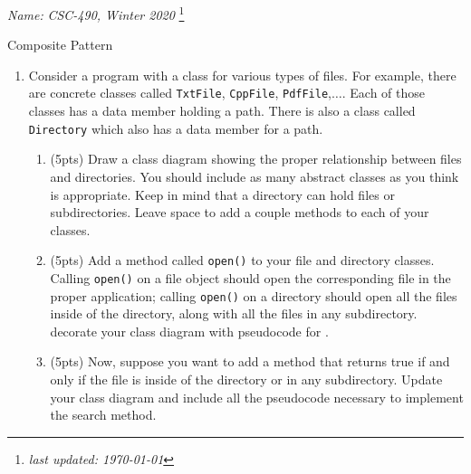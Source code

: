 \documentclass[11pt]{article}
\newlength{\up}\setlength{\up}{-\baselineskip}
\newcommand\blfootnote[1]{%
  \begingroup
  \renewcommand\thefootnote{}\footnote{#1}%
  \addtocounter{footnote}{-1}%
  \endgroup
}
\begin{document}
\noindent\emph{Name:}
\hfill
\emph{CSC-490, Winter 2020}
\blfootnote{\emph{last updated: \today}}

\vspace{-0.4in}

\begin{center}
  {\huge Composite Pattern}
\end{center}

\medskip




\begin{enumerate}

  \item Consider a program with a class for various types of files. For example, there are concrete classes called \texttt{TxtFile}, \texttt{CppFile}, \texttt{PdfFile},$\ldots$. Each of those classes has a data member holding a path. There is also a class called \texttt{Directory} which also has a data member for a path.  

  \begin{enumerate}
    \item (5pts) Draw a class diagram showing the proper relationship between files and directories. You should include as many abstract classes as you think is appropriate. Keep in mind that a directory can hold files or subdirectories. Leave space to add a couple methods to each of your classes.

    \vfill

    \item (5pts) Add a method called \texttt{open()} to your file and directory classes. Calling \texttt{open()} on a file object should open the corresponding file in the proper application; calling \texttt{open()} on a directory should open all the files inside of the directory, along with all the files in any subdirectory. decorate your class diagram with pseudocode for . 

    \item (5pts) Now, suppose you want to add a method  that returns true if and only if the file is inside of the directory or in any subdirectory. Update your class diagram and include all the pseudocode necessary to implement the search method.

  \end{enumerate}


\end{enumerate}
\end{document}
